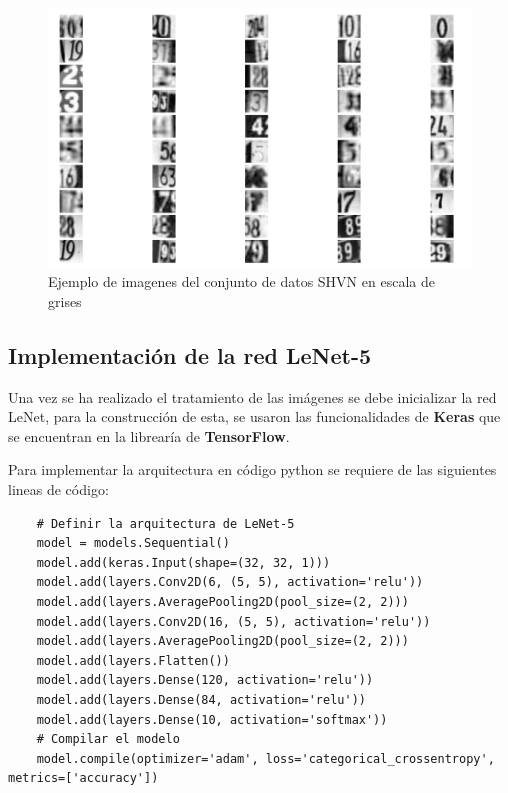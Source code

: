 \newpage

\begin{figure}[H]
    \centering
    \includegraphics[width=\linewidth]{src/figures/shvn_gray.png}
    \caption{Ejemplo de imagenes del conjunto de datos SHVN en escala de grises}
    \label{fig:shvn_gray}
\end{figure}

\subsection{Implementación de la red LeNet-5}

Una vez se ha realizado el tratamiento de las imágenes se debe inicializar la red LeNet, para la construcción de esta, se usaron
las funcionalidades de \textbf{Keras} que se encuentran en la librearía de \textbf{TensorFlow}. 

Para implementar la arquitectura en código python se requiere de las siguientes lineas de código:

\begin{lstlisting}
    # Definir la arquitectura de LeNet-5
    model = models.Sequential()
    model.add(keras.Input(shape=(32, 32, 1)))
    model.add(layers.Conv2D(6, (5, 5), activation='relu'))
    model.add(layers.AveragePooling2D(pool_size=(2, 2)))
    model.add(layers.Conv2D(16, (5, 5), activation='relu'))
    model.add(layers.AveragePooling2D(pool_size=(2, 2)))
    model.add(layers.Flatten())
    model.add(layers.Dense(120, activation='relu'))
    model.add(layers.Dense(84, activation='relu'))
    model.add(layers.Dense(10, activation='softmax'))
    # Compilar el modelo
    model.compile(optimizer='adam', loss='categorical_crossentropy', metrics=['accuracy'])
\end{lstlisting}

